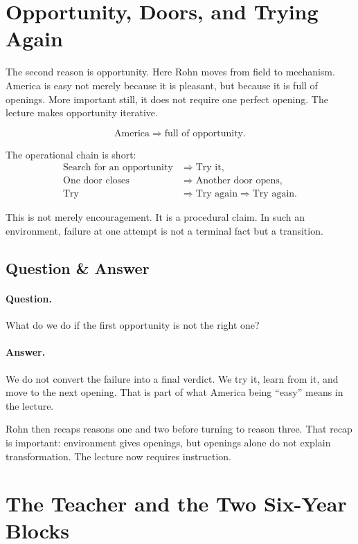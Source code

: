 \section{Opportunity, Doors, and Trying Again}

The second reason is opportunity. Here Rohn moves from field to mechanism. America is easy not merely because it is pleasant, but because it is full of openings. More important still, it does not require one perfect opening. The lecture makes opportunity iterative.

\begin{equation}
\text{America} \Longrightarrow \text{full of opportunity}.
\end{equation}

The operational chain is short:
\begin{align}
\text{Search for an opportunity} &\Longrightarrow \text{Try it},\\
\text{One door closes} &\Longrightarrow \text{Another door opens},\\
\text{Try} &\Longrightarrow \text{Try again} \Longrightarrow \text{Try again}.
\end{align}

This is not merely encouragement. It is a procedural claim. In such an environment, failure at one attempt is not a terminal fact but a transition.

\subsection{Question \& Answer}

\paragraph{Question.} What do we do if the first opportunity is not the right one?

\paragraph{Answer.} We do not convert the failure into a final verdict. We try it, learn from it, and move to the next opening. That is part of what America being ``easy'' means in the lecture.

Rohn then recaps reasons one and two before turning to reason three. That recap is important: environment gives openings, but openings alone do not explain transformation. The lecture now requires instruction.

\section{The Teacher and the Two Six-Year Blocks}

